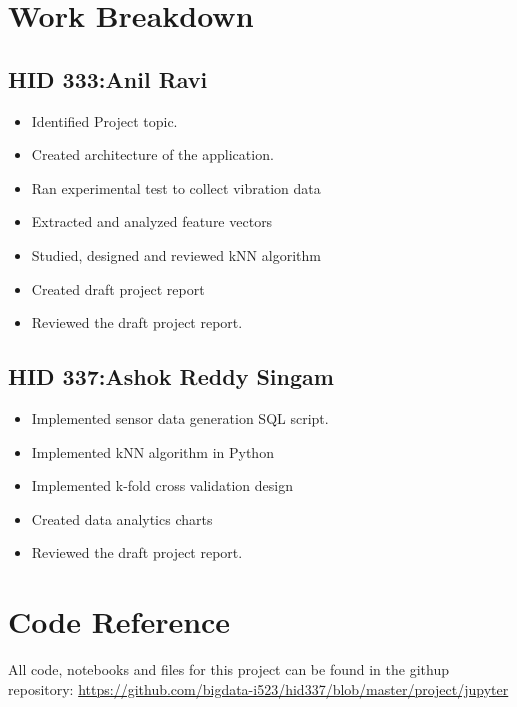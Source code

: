 \documentclass[sigconf]{acmart}
\begin{document}

 
\newpage
\appendix
\section{Work Breakdown}
\subsection{HID 333:Anil Ravi}
\begin{itemize}
  \item Identified Project topic.
  \item Created architecture of the application.
  \item Ran experimental test to collect vibration data
  \item Extracted and analyzed feature vectors
  \item Studied, designed and reviewed kNN algorithm
  \item Created draft project report
  \item Reviewed the draft project report.
  
\end{itemize}
\subsection{HID 337:Ashok Reddy Singam}
\begin{itemize}
  \item Implemented sensor data generation SQL script.
  \item Implemented kNN algorithm in Python
  \item Implemented k-fold cross validation design
  \item Created data analytics charts
  \item Reviewed the draft project report.
\end{itemize}

\section{Code Reference}
All code, notebooks and files for this project can be found in the githup repository:
\url{https://github.com/bigdata-i523/hid337/blob/master/project/jupyter}
\end{document}

